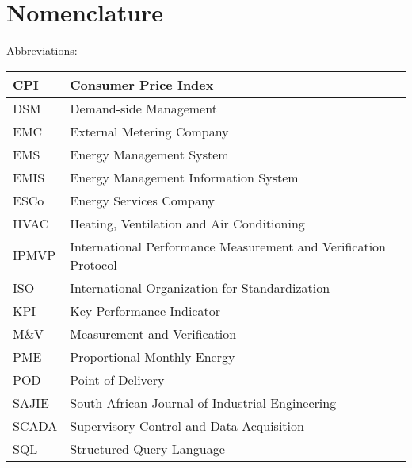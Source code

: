 

\cleardoublepage
{}
\chapter*{Nomenclature}

\begin{center}
Abbreviations:
\end{center}
\begin{table}[H]
\centering
\begin{small}
{\tabulinesep=1.4mm
\begin{tabu}{ | l | l | }
        \hline CPI        & Consumer Price Index\\
        \hline DSM        & Demand-side Management\\
        \hline EMC        & External Metering Company\\
        \hline EMS        & Energy Management System\\
        \hline EMIS       & Energy Management Information System\\
        \hline ESCo       & Energy Services Company\\
        \hline HVAC       & Heating, Ventilation and Air Conditioning\\
        \hline IPMVP      & International Performance Measurement and Verification Protocol\\
        \hline ISO        & International Organization for Standardization\\
        \hline KPI        & Key Performance Indicator\\
        \hline M\&V       & Measurement and Verification\\
        \hline PME        & Proportional Monthly Energy\\
        \hline POD        & Point of Delivery\\
        \hline SAJIE      & South African Journal of Industrial Engineering\\
        \hline SCADA      & Supervisory Control and Data Acquisition\\
        \hline SQL        & Structured Query Language\\
        \hline
\end{tabu}}
\end{small}
\end{table}

